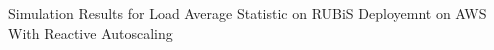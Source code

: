 \label{reactive} Simulation Results for Load Average Statistic on RUBiS Deployemnt on AWS With Reactive Autoscaling